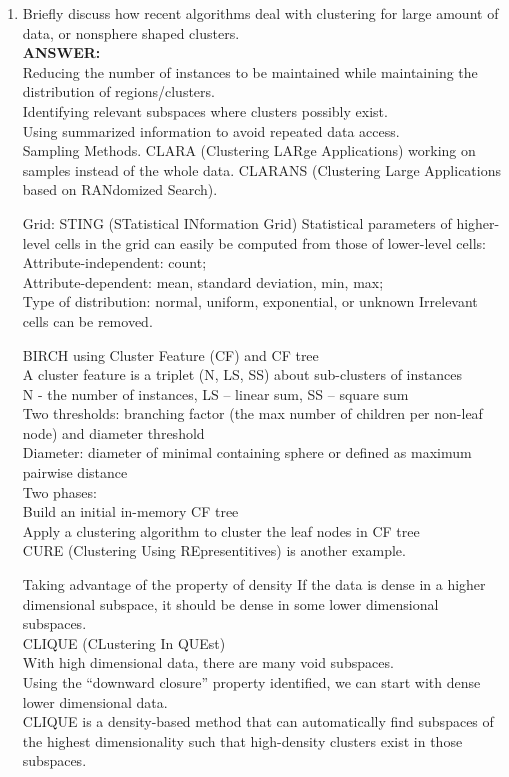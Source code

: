 \documentclass{article}
\begin{document}
\begin{enumerate}
\item Briefly discuss how recent algorithms deal with clustering for
  large amount of data, or nonsphere shaped clusters.  \\
\textbf{ANSWER:} \\
Reducing the number of instances to be maintained while maintaining
the distribution of regions/clusters.\\
Identifying relevant subspaces where clusters possibly exist.\\
Using summarized information to avoid  repeated data access.\\

Sampling Methods.
CLARA (Clustering LARge Applications) working on samples instead of
the whole data.
CLARANS (Clustering Large Applications based on RANdomized Search).

Grid: STING (STatistical INformation Grid)
Statistical parameters of higher-level cells in the grid can easily be
computed from those of lower-level cells: \\
Attribute-independent: count; \\ 
Attribute-dependent: mean, standard deviation, min, max; \\
Type of distribution: normal, uniform, exponential, or unknown
Irrelevant cells can be removed.

BIRCH using Cluster Feature (CF) and CF tree \\
A cluster feature is a triplet (N, LS, SS) about sub-clusters of instances \\
N - the number of instances, LS – linear sum, SS – square sum \\
Two thresholds: branching factor (the max number of children per
non-leaf node) and diameter threshold \\ 
Diameter: diameter of minimal containing sphere or defined as maximum pairwise distance \\
Two phases: \\
Build an initial in-memory CF tree\\ 
Apply a clustering algorithm to cluster the leaf nodes in CF tree \\
CURE (Clustering Using REpresentitives) is another example. 

Taking advantage of the property of density
If the data is dense in a higher dimensional subspace, it should be
dense in some lower dimensional subspaces.\\
CLIQUE (CLustering In QUEst) \\
With high dimensional data, there are many void subspaces.\\ 
Using the “downward closure” property identified, we can start with
dense lower dimensional data. \\
CLIQUE is a density-based method that can automatically find subspaces
of the highest dimensionality such that high-density clusters exist in
those subspaces.


\end{enumerate}
\end{document}

